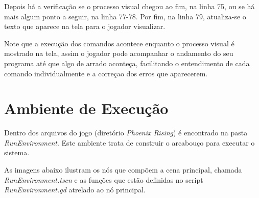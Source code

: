 Depois há a verificação se o processo visual chegou ao fim, na linha 75, ou 
se há mais algum ponto a seguir, na linha 77-78. Por fim, na linha 79,
atualiza-se o texto que aparece na tela para o jogador visualizar.

Note que a execução dos comandos acontece enquanto o processo visual é mostrado
na tela, assim o jogador pode acompanhar o andamento do seu programa até que
algo de arrado aconteça, facilitando o entendimento de cada comando 
individualmente e a correçao dos erros que aparecerem.

\section{Ambiente de Execução}

Dentro dos arquivos do jogo (diretório \textit{Phoenix Rising}) é encontrado na
pasta \textit{RunEnvironment}. Este ambiente trata de construir o arcabouço 
para executar o sistema.

As imagens abaixo ilustram os nós que compõem a cena principal, chamada 
\textit{RunEnvironment.tscn} e as funções que estão definidas no script
\textit{RunEnvironment.gd} atrelado ao nó principal.

